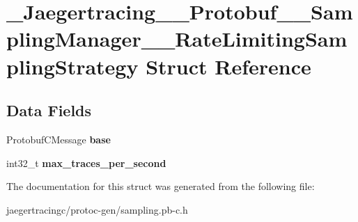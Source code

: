 \hypertarget{struct__Jaegertracing____Protobuf____SamplingManager____RateLimitingSamplingStrategy}{}\section{\+\_\+\+Jaegertracing\+\_\+\+\_\+\+Protobuf\+\_\+\+\_\+\+Sampling\+Manager\+\_\+\+\_\+\+Rate\+Limiting\+Sampling\+Strategy Struct Reference}
\label{struct__Jaegertracing____Protobuf____SamplingManager____RateLimitingSamplingStrategy}
\subsection*{Data Fields}
\begin{DoxyCompactItemize}
\item 
\mbox{\label{struct__Jaegertracing____Protobuf____SamplingManager____RateLimitingSamplingStrategy_a796a0f18fc2f503c0b6986c547283eaa}} 
Protobuf\+C\+Message {\bfseries base}
\item 
\mbox{\label{struct__Jaegertracing____Protobuf____SamplingManager____RateLimitingSamplingStrategy_a2fe496a01a9eff8b38c97d67565cd182}} 
int32\+\_\+t {\bfseries max\+\_\+traces\+\_\+per\+\_\+second}
\end{DoxyCompactItemize}


The documentation for this struct was generated from the following file\+:\begin{DoxyCompactItemize}
\item 
jaegertracingc/protoc-\/gen/sampling.\+pb-\/c.\+h\end{DoxyCompactItemize}
